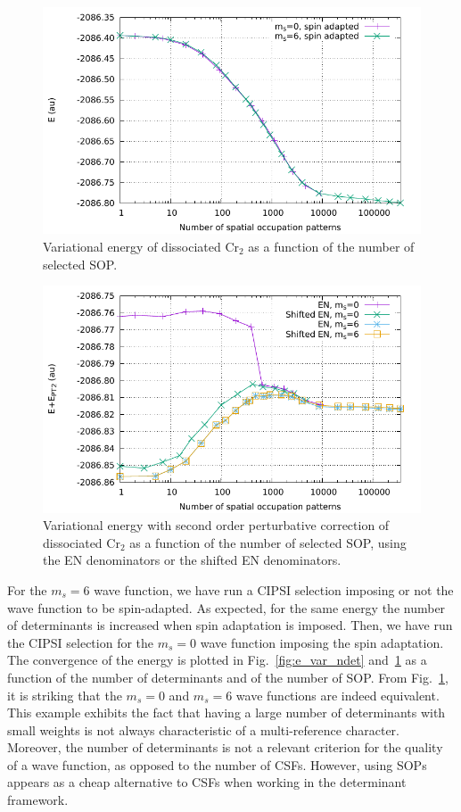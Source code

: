 \documentclass[aip,jcp,reprint,showkeys]{revtex4-1}
\newcommand{\sop}{SOP}
\newcommand{\cipsi}{CIPSI}
\newcommand{\csf}{CSF}
\begin{document}
\begin{figure}
\includegraphics[width=0.9\columnwidth]{e_var_nsop}
\caption{Variational energy of dissociated Cr$_2$ as a function of the number of
selected {\sop}.}
\label{fig:e_var_nsop}
\end{figure}

\begin{figure}
\includegraphics[width=0.9\columnwidth]{e_pt2_nsop}
\caption{Variational energy with second order perturbative correction of
dissociated Cr$_2$ as a function of the number of selected {\sop}, using
the EN denominators or the shifted EN denominators.}
\label{fig:e_pt2_nsop}
\end{figure}

For the $m_s=6$ wave function, we have run a {\cipsi} selection imposing or not the
wave function to be spin-adapted. As expected, for the same energy the number of
determinants is increased when spin adaptation is imposed. Then, we have run the
{\cipsi} selection for the $m_s=0$ wave function imposing the spin adaptation.
The convergence of the energy is plotted in Fig.~\ref{fig:e_var_ndet}
and~\ref{fig:e_var_nsop} as a function of the number of determinants and of the
number of {\sop}.
From Fig.~\ref{fig:e_var_nsop}, it is striking that the $m_s=0$ and $m_s=6$
wave functions are indeed equivalent.
This example exhibits the fact that having a large number of determinants with
small weights is not always characteristic of a multi-reference character.
Moreover, the number of determinants is not a relevant criterion for the
quality of a wave function, as opposed to the number of {\csf s}. However, using {\sop s}
appears as a cheap alternative to {\csf s} when working in the determinant
framework.
\end{document}
